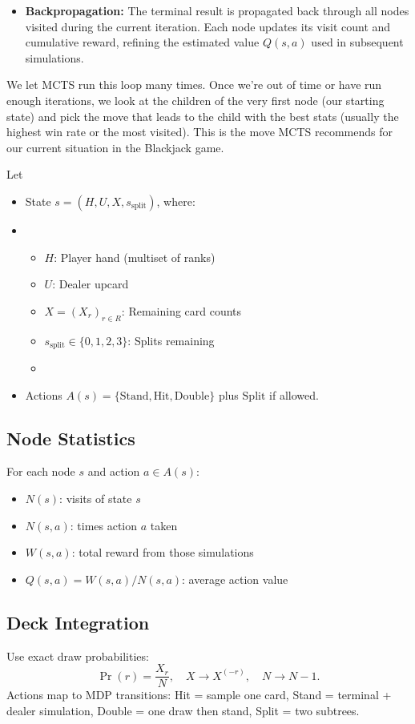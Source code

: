 \documentclass[12pt,a4paper]{cibb}
\begin{document}
\begin{itemize} 
    \item \textbf{Backpropagation:} The terminal result is propagated back through all nodes visited during the current iteration. Each node updates its visit count and cumulative reward, refining the estimated value $Q(s, a)$ used in subsequent simulations.
\end{itemize}

We let MCTS run this loop many times. Once we're out of time or have run enough iterations, we look at the children of the very first node (our starting state) and pick the move that leads to the child with the best stats (usually the highest win rate or the most visited). This is the move MCTS recommends for our current situation in the Blackjack game.

Let
\begin{itemize}
    \item State \(s=(H, U, X, s_{\mathrm{split}})\), where:
    \item \begin{itemize}[leftmargin=1.5cm]
\item \(H\): Player hand (multiset of ranks)
\item \(U\): Dealer up\-card
\item \(X=(X_r)_{r\in R}\): Remaining card counts
\item \(s_{\mathrm{split}}\in\{0,1,2,3\}\): Splits remaining
    \item \end{itemize}
    \item Actions \(A(s)=\{\mathrm{Stand},\mathrm{Hit},\mathrm{Double}\}\) plus \(\mathrm{Split}\) if allowed.
\end{itemize}

\subsection{Node Statistics}
For each node \(s\) and action \(a\in A(s)\):
\begin{itemize}[leftmargin=1.5cm]
  \item \(N(s)\): visits of state \(s\)
  \item \(N(s,a)\): times action \(a\) taken
  \item \(W(s,a)\): total reward from those simulations
  \item \(Q(s,a)=W(s,a)/N(s,a)\): average action value
\end{itemize}

\subsection{{Deck Integration}}
Use exact draw probabilities:
\[\Pr(r)=\frac{X_r}{N},\quad X\to X^{(-r)},\quad N\to N-1.\]
Actions map to MDP transitions: Hit = sample one card, Stand = terminal + dealer simulation, Double = one draw then stand, Split = two subtrees.
\end{document}

